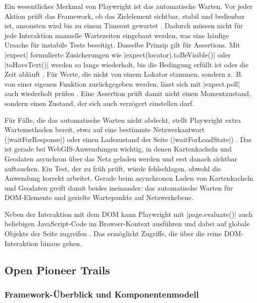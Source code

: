 Ein wesentliches Merkmal von Playwright ist das automatische Warten. Vor jeder Aktion prüft das Framework, ob das Zielelement sichtbar, stabil und bedienbar ist, ansonsten wird bis zu einem Timeout gewartet \parencite[Auto-waiting]{microsoft_auto-waiting_nodate}. Dadurch müssen nicht für jede Interaktion manuelle Wartezeiten eingebaut werden, was eine häufige Ursache für instabile Tests beseitigt. Dasselbe Prinzip gilt für Assertions. Mit \code|expect| formulierte Zusicherungen wie \code|expect(locator).toBeVisible()| oder \code|toHaveText()| werden so lange wiederholt, bis die Bedingung erfüllt ist oder die Zeit abläuft \parencite[Assertions]{microsoft_assertions_nodate}. Für Werte, die nicht von einem Lokator stammen, sondern z.~B. von einer eigenen Funktion zurückgegeben werden, lässt sich mit \code|expect.poll| auch wiederholt prüfen \parencite[expect.poll]{microsoft_assertions_nodate}. Eine Assertion prüft damit nicht einen Momentzustand, sondern einen Zustand, der sich auch verzögert einstellen darf.

Für Fälle, die das automatische Warten nicht abdeckt, stellt Playwright extra Wartemethoden bereit, etwa auf eine bestimmte Netzwerkantwort (\code|waitForResponse|) oder einen Ladezustand der Seite (\code|waitForLoadState|) \parencite[Page]{microsoft_page_nodate}. Das ist gerade bei WebGIS-Anwendungen wichtig, in denen Kartenkacheln und Geodaten asynchron über das Netz geladen werden und erst danach sichtbar auftauchen. Ein Test, der zu früh prüft, würde fehlschlagen, obwohl die Anwendung korrekt arbeitet. Gerade beim asynchronen Laden von Kartenkacheln und Geodaten greift damit beides ineinander: das automatische Warten für \ac{DOM}-Elemente und gezielte Wartepunkte auf Netzwerkebene.

Neben der Interaktion mit dem \ac{DOM} kann Playwright mit \code|page.evaluate()| auch beliebigen JavaScript-Code im Browser-Kontext ausführen und dabei auf globale Objekte der Seite zugreifen \parencite[Evaluating JavaScript]{microsoft_evaluating_nodate}. Das ermöglicht Zugriffe, die über die reine \ac{DOM}-Interaktion hinaus gehen.

\subsection{Open Pioneer Trails}

\subsubsection{Framework-Überblick und Komponentenmodell}

